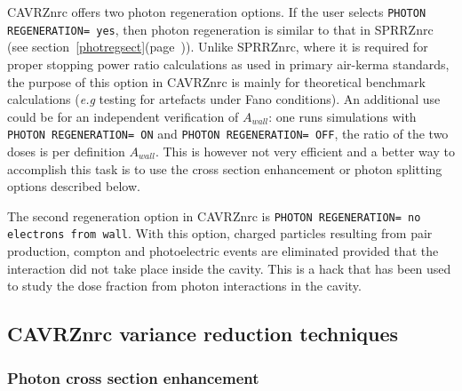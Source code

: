 \documentclass[12pt,twoside]{article}  %
\newcommand{\lpage}[1]{(page~\pageref{#1})}
\begin{document}
CAVRZnrc offers two photon regeneration options.  If the user selects
{\tt PHOTON REGENERATION= yes}, then photon regeneration is similar to
that in SPRRZnrc (see section~\ref{photregsect}\lpage{photregsect}).
Unlike SPRRZnrc, where it is required for proper
stopping power ratio calculations as used in primary
air-kerma standards, the purpose of this option in CAVRZnrc is
mainly for theoretical benchmark calculations ({\em e.g} testing
for artefacts under Fano conditions). An additional use
could be for an independent verification of $A_{wall}$: one
runs simulations with {\tt PHOTON REGENERATION= ON} and {\tt PHOTON
REGENERATION= OFF}, the
ratio of the two doses is per definition $A_{wall}$. This is
however not very efficient and a better way to accomplish
this task is to use the cross section enhancement or
photon splitting options described below.

The second regeneration option in CAVRZnrc is {\tt PHOTON REGENERATION= no
electrons from wall}.  With this option, charged particles resulting from
pair production, compton and photoelectric events are eliminated provided
that the interaction did not take place inside the cavity.
This is a hack that has been used to study
the dose fraction from photon interactions in the cavity.

\subsection{CAVRZnrc variance reduction techniques}

\subsubsection{Photon cross section enhancement}
\label{cavrz_cse}
\end{document}
